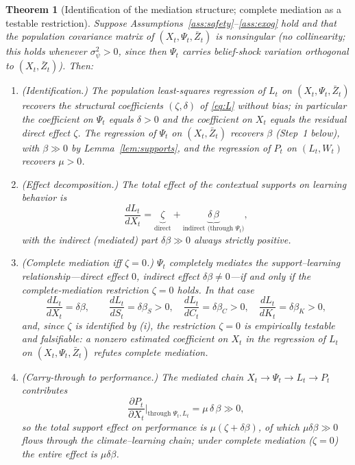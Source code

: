 \documentclass{amsart}
\newtheorem{theorem}{Theorem}
\theoremstyle{definition}
\theoremstyle{remark}
\begin{document}
\begin{theorem}[Identification of the mediation structure; complete mediation as a testable restriction]%
\label{thm:main}
Suppose Assumptions~\ref{ass:safety}--\ref{ass:exog} hold and that the
population covariance matrix of $(X_t,\Psi_t,\bar Z_t)$ is nonsingular
(no collinearity; this holds whenever $\sigma^2_\psi>0$, since then
$\Psi_t$ carries belief-shock variation orthogonal to $(X_t,\bar Z_t)$).
Then:
\begin{enumerate}
\item[\textup{(i)}] \emph{(Identification.)} The population least-squares
regression of $L_t$ on $(X_t,\Psi_t,\bar Z_t)$ recovers the structural
coefficients $(\zeta,\delta)$ of \eqref{eq:L} without bias; in particular
the coefficient on $\Psi_t$ equals $\delta>0$ and the coefficient on $X_t$
equals the residual direct effect $\zeta$. The regression of $\Psi_t$ on
$(X_t,\bar Z_t)$ recovers $\beta$ \textup{(Step~1 below)}, with
$\beta\gg0$ by Lemma~\ref{lem:supports}, and the regression of $P_t$ on
$(L_t,W_t)$ recovers $\mu>0$.
\item[\textup{(ii)}] \emph{(Effect decomposition.)} The total effect of
the contextual supports on learning behavior is
\begin{equation}\label{eq:decomp}
\frac{dL_t}{dX_t}
=\underbrace{\zeta}_{\text{direct}}
+\underbrace{\delta\,\beta}_{\text{indirect (through }\Psi_t)},
\end{equation}
with the indirect (mediated) part $\delta\beta\gg0$ always strictly
positive.
\item[\textup{(iii)}] \emph{(Complete mediation iff $\zeta=0$.)} $\Psi_t$
\emph{completely} mediates the support--learning relationship---direct
effect $0$, indirect effect $\delta\beta\neq0$---\emph{if and only if} the
complete-mediation restriction $\zeta=0$ holds. In that case
\[
\frac{dL_t}{dX_t}=\delta\beta,\qquad
\frac{dL_t}{dS_t}=\delta\beta_S>0,\quad
\frac{dL_t}{dC_t}=\delta\beta_C>0,\quad
\frac{dL_t}{dK_t}=\delta\beta_K>0,
\]
and, since $\zeta$ is identified by (i), the restriction $\zeta=0$ is
\emph{empirically testable and falsifiable}: a nonzero estimated
coefficient on $X_t$ in the regression of $L_t$ on $(X_t,\Psi_t,\bar Z_t)$
refutes complete mediation.
\item[\textup{(iv)}] \emph{(Carry-through to performance.)} The mediated
chain $X_t\to\Psi_t\to L_t\to P_t$ contributes
\begin{equation}\label{eq:perfchain}
\frac{\partial P_t}{\partial X_t}\Big|_{\text{through }\Psi_t,L_t}
=\mu\,\delta\,\beta\gg0,
\end{equation}
so the total support effect on performance is $\mu(\zeta+\delta\beta)$, of
which $\mu\delta\beta\gg0$ flows through the climate--learning chain;
under complete mediation ($\zeta=0$) the entire effect is
$\mu\delta\beta$.
\end{enumerate}
\end{theorem}
\end{document}
